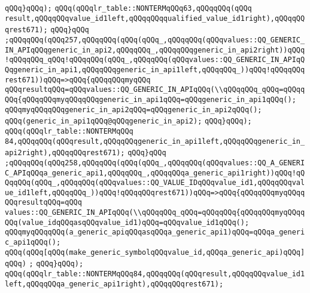 \verb|qQQq}qQQq);|\newline
\verb|qQQq(qQQqlr_table::NONTERMqQQq63,qQQqqQQq(qQQq|\newline
\verb|result,qQQqqQQqvalue_id1left,qQQqqQQqqualified_value_id1right),qQQqqQQqrest671);|\newline
\verb|qQQq}qQQq|\newline
\verb|;qQQqqQQq(qQQq257,qQQqqQQq(qQQq(qQQq_,qQQqqQQq(qQQqvalues::QQ_GENERIC_IN_APIqQQqgeneric_in_api2,qQQqqQQq_,qQQqqQQqgeneric_in_api2right))qQQq!qQQqqQQq_qQQq!qQQqqQQq(qQQq_,qQQqqQQq(qQQqvalues::QQ_GENERIC_IN_APIqQQqgeneric_in_api1,qQQqqQQqgeneric_in_api1left,qQQqqQQq_))qQQq!qQQqqQQqrest671))qQQq=>qQQq{qQQqqQQqmyqQQq|\newline
\verb|qQQqresultqQQq=qQQqvalues::QQ_GENERIC_IN_APIqQQq(\\qQQqqQQq_qQQq=qQQqqQQq{qQQqqQQqmyqQQqqQQqgeneric_in_api1qQQq=qQQqgeneric_in_api1qQQq();|\newline
\verb|qQQqmyqQQqqQQqgeneric_in_api2qQQq=qQQqgeneric_in_api2qQQq();|\newline
\verb|qQQq(generic_in_api1qQQq@qQQqgeneric_in_api2);|\newline
\verb|qQQq}qQQq);|\newline
\verb|qQQq(qQQqlr_table::NONTERMqQQq|\newline
\verb|84,qQQqqQQq(qQQqresult,qQQqqQQqgeneric_in_api1left,qQQqqQQqgeneric_in_api2right),qQQqqQQqrest671);|\newline
\verb|qQQq}qQQq|\newline
\verb|;qQQqqQQq(qQQq258,qQQqqQQq(qQQq(qQQq_,qQQqqQQq(qQQqvalues::QQ_A_GENERIC_APIqQQqa_generic_api1,qQQqqQQq_,qQQqqQQqa_generic_api1right))qQQq!qQQqqQQq(qQQq_,qQQqqQQq(qQQqvalues::QQ_VALUE_IDqQQqvalue_id1,qQQqqQQqvalue_id1left,qQQqqQQq_))qQQq!qQQqqQQqrest671))qQQq=>qQQq{qQQqqQQqmyqQQqqQQqresultqQQq=qQQq|\newline
\verb|values::QQ_GENERIC_IN_APIqQQq(\\qQQqqQQq_qQQq=qQQqqQQq{qQQqqQQqmyqQQqqQQq(value_idqQQqasqQQqvalue_id1)qQQq=qQQqvalue_id1qQQq();|\newline
\verb|qQQqmyqQQqqQQq(a_generic_apiqQQqasqQQqa_generic_api1)qQQq=qQQqa_generic_api1qQQq();|\newline
\verb|qQQq(qQQq[qQQq(make_generic_symbolqQQqvalue_id,qQQqa_generic_api)qQQq]qQQq)|\newline
\verb|;|\newline
\verb|qQQq}qQQq);|\newline
\verb|qQQq(qQQqlr_table::NONTERMqQQq84,qQQqqQQq(qQQqresult,qQQqqQQqvalue_id1left,qQQqqQQqa_generic_api1right),qQQqqQQqrest671);|\newline
